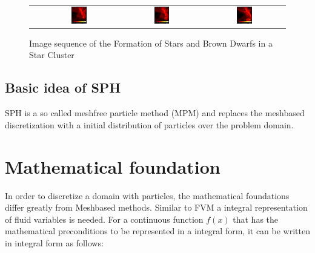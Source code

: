 \begin{figure}[htp]
\begin{tabular}{cccc}
&   \includegraphics[width=0.2\textwidth]{Figures/sph_bates_starcluster_13.jpg}  
&   \includegraphics[width=0.2\textwidth]{Figures/sph_bates_starcluster_14.jpg}
&   \includegraphics[width=0.2\textwidth]{Figures/sph_bates_starcluster_15.jpg}
\\

\end{tabular}
\caption{Image sequence of the Formation of Stars and Brown Dwarfs in a Star Cluster}
\label{fig:SPHStarCluster}
\end{figure}

\subsection{Basic idea of SPH}
SPH is a so called meshfree particle method (MPM) and replaces the meshbased discretization with a initial distribution of particles over the problem domain. 

\section{Mathematical foundation}

In order to discretize a domain with particles, the mathematical foundations differ greatly from Meshbased methods. Similar to FVM a integral representation of fluid variables is needed. For a continuous function $f(x)$ that has the mathematical preconditions to be represented in a integral form, it can be written in integral form as follows:

